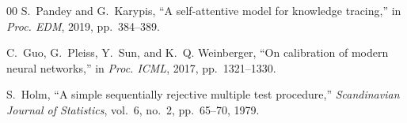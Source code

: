 \documentclass[conference]{IEEEtran}
\begin{document}
\begin{thebibliography}{00}
S.~Pandey and G.~Karypis, ``A self-attentive model for knowledge tracing,'' in
\emph{Proc. EDM}, 2019, pp.~384--389.

C.~Guo, G.~Pleiss, Y.~Sun, and K.~Q. Weinberger, ``On calibration of modern neural
networks,'' in \emph{Proc. ICML}, 2017, pp.~1321--1330.

S.~Holm, ``A simple sequentially rejective multiple test procedure,''
\emph{Scandinavian Journal of Statistics}, vol.~6, no.~2, pp.~65--70, 1979.

\end{thebibliography}
\end{document}
